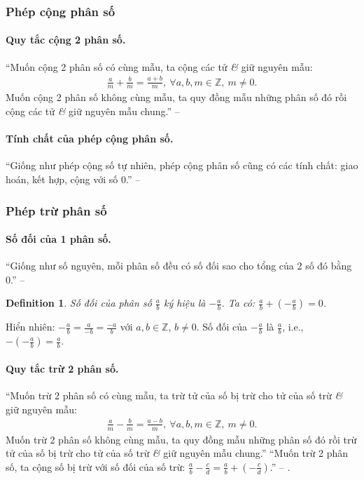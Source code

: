 \documentclass{article}
\numberwithin{equation}{section}
\newtheorem{definition}{Definition}[section]
\begin{document}
\subsubsection{Phép cộng phân số}

\paragraph{Quy tắc cộng 2 phân số.} ``Muốn cộng 2 phân số có cùng mẫu, ta cộng các tử \textit{\&} giữ nguyên mẫu:
\begin{align*}
	\frac{a}{m} + \frac{b}{m} = \frac{a + b}{m},\ \forall a,b,m\in\mathbb{Z},\ m\ne 0.
\end{align*}
Muốn cộng 2 phân số không cùng mẫu, ta quy đồng mẫu những phân số đó rồi cộng các tử \textit{\&} giữ nguyên mẫu chung.'' -- \cite[pp. 34--35]{Thai_Anh_Dat_Ha_Loan_Nam_Quang_Toan_6_tap_2}

\paragraph{Tính chất của phép cộng phân số.} ``Giống như phép cộng số tự nhiên, phép cộng phân số cũng có các tính chất: giao hoán, kết hợp, cộng với số 0.'' -- \cite[pp. 35]{Thai_Anh_Dat_Ha_Loan_Nam_Quang_Toan_6_tap_2}

\subsubsection{Phép trừ phân số}

\paragraph{Số đối của 1 phân số.} ``Giống như số nguyên, mỗi phân số đều có số đối sao cho tổng của 2 số đó bằng 0.'' -- \cite[pp. 36]{Thai_Anh_Dat_Ha_Loan_Nam_Quang_Toan_6_tap_2}

\begin{definition}
	\emph{Số đối} của phân số $\frac{a}{b}$ ký hiệu là $-\frac{a}{b}$. Ta có: $\frac{a}{b} + \left(-\frac{a}{b}\right) = 0$.
\end{definition}
Hiển nhiên: $-\frac{a}{b} = \frac{a}{-b} = \frac{-a}{b}$ với $a,b\in\mathbb{Z}$, $b\ne 0$. Số đối của $-\frac{a}{b}$ là $\frac{a}{b}$, i.e., $-\left(-\frac{a}{b}\right) = \frac{a}{b}$.

\paragraph{Quy tắc trừ 2 phân số.} ``Muốn trừ 2 phân số có cùng mẫu, ta trừ tử của số bị trừ cho tử của số trừ \textit{\&} giữ nguyên mẫu:
\begin{align*}
	\frac{a}{m} - \frac{b}{m} = \frac{a - b}{m},\ \forall a,b,m\in\mathbb{Z},\ m\ne 0.
\end{align*}
Muốn trừ 2 phân số không cùng mẫu, ta quy đồng mẫu những phân số đó rồi trừ tử của số bị trừ cho tử của số trừ \textit{\&} giữ nguyên mẫu chung.'' ``Muốn trừ 2 phân số, ta cộng số bị trừ với số đối của số trừ: $\frac{a}{b} - \frac{c}{d} = \frac{a}{b} + \left(-\frac{c}{d}\right)$.'' -- \cite[pp. 36--37]{Thai_Anh_Dat_Ha_Loan_Nam_Quang_Toan_6_tap_2}.
\end{document}
